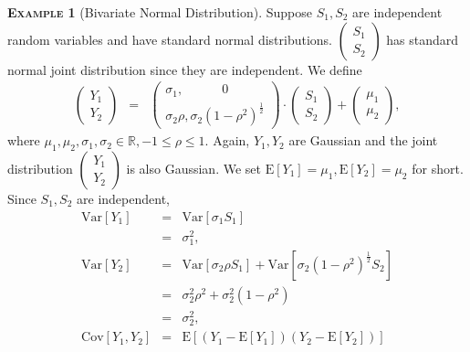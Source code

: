 \documentclass[a4paper, twoside, 11pt]{article}
\theoremstyle{definition}
\newtheorem{example}[definition]{\scshape Example}
\begin{document}
\begin{example}[Bivariate Normal Distribution]
  Suppose $S_1, S_2$ are independent random variables and have standard normal distributions. $\left(
    \begin{array}{c}
      S_1 \\
      S_2
    \end{array}
  \right)$  has standard normal joint distribution since they are independent. We define
  \begin{eqnarray}
	\left(
    \begin{array}{c}
      Y_1 \\
      Y_2
    \end{array}
	\right)
	&=& 
	\left(
    \begin{array}{l}
	  \sigma_1,\hspace{3em} 0 \\
	  \sigma_2 \rho, \sigma_2(1-\rho^2)^{\frac{1}{2}}
    \end{array}
  \right) \cdot
	\left(
    \begin{array}{c}
      S_1 \\
      S_2
    \end{array}
  \right)  +
  \left(
    \begin{array}{c}
      \mu_1 \\
      \mu_2
    \end{array}
  \right)
  \label{sec:bi},
  \end{eqnarray}
  where $\mu_1, \mu_2, \sigma_1, \sigma_2 \in \mathbb{R}, -1 \le \rho \le 1$. Again, $Y_1, Y_2$ are Gaussian and the joint distribution  $\left(
    \begin{array}{c}
      Y_1 \\
      Y_2
    \end{array}
	\right)$ is also Gaussian. We set $\mathrm{E}[Y_1] = \mu_1, \mathrm{E}[Y_2] = \mu_2 $ for short. Since $S_1, S_2$ are independent,
	\begin{eqnarray*}
	  \mathrm{Var}[Y_1] &=& \mathrm{Var}[\sigma_1 S_1]\\
						 &=& \sigma_1^2 ,\\
						 \mathrm{Var}[Y_2] &=& \mathrm{Var}[\sigma_2\rho S_1] + \mathrm{Var}[\sigma_2 (1-\rho^2)^{\frac{1}{2}} S_2]\\
						 &=& \sigma_2^2 \rho^2 + \sigma_2^2(1 - \rho^2)\\
						 &=& \sigma_2^2,\\
						 \mathrm{Cov}[Y_1, Y_2] &=& \mathrm{E}[(Y_1 - \mathrm{E}[Y_1])(Y_2 - \mathrm{E}[Y_2])]\\

\end{eqnarray*}
\end{example}
\end{document}
